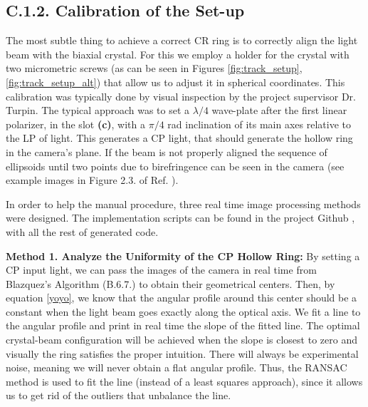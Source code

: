 \documentclass[11pt, a4paper, twoside]{article} %
\begin{document}

 
\subsection*{C.1.2. Calibration of the Set-up} 

The most subtle thing to achieve a correct CR ring is to correctly align the light beam with the biaxial crystal. For this we employ a holder for the crystal with two micrometric screws (as can be seen in Figures \ref{fig:track_setup},\ref{fig:track_setup_alt}) that allow us to adjust it in spherical coordinates. This calibration was typically done by visual inspection by the project supervisor Dr. Turpin. The typical approach was to set a $\lambda/4$ wave-plate after the first linear polarizer, in the slot {\bf (c)}, with a $\pi/4$ rad inclination of its main axes relative to the LP of light. This generates a CP light, that should generate the hollow ring in the camera's plane. If the beam is not properly aligned the sequence of ellipsoids until two points due to birefringence can be seen in the camera (see example images in Figure 2.3. of Ref. \cite{Turpin}).

In order to help the manual procedure, three real time image processing methods were designed. The implementation scripts can be found in the project Github \cite{github}, with all the rest of generated code.

{\bf Method 1. Analyze the Uniformity of the CP Hollow Ring:} By setting a CP input light, we can pass the images of the camera in real time from Blazquez's Algorithm (B.6.7.) to obtain their geometrical centers. Then, by equation \eqref{yoyo}, we know that the angular profile around this center should be a constant when the light beam goes exactly along the optical axis. We fit a line to the angular profile and print in real time the slope of the fitted line. The optimal crystal-beam configuration will be achieved when the slope is closest to zero and visually the ring satisfies the proper intuition. There will always be experimental noise, meaning we will never obtain a flat angular profile. Thus, the RANSAC method \cite{RANSAC} is used to fit the line (instead of a least squares approach), since it allows us to get rid of the outliers that unbalance the line.
\end{document}

